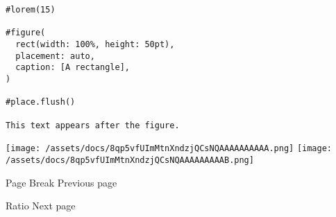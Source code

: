 \begin{verbatim}
#lorem(15)

#figure(
  rect(width: 100%, height: 50pt),
  placement: auto,
  caption: [A rectangle],
)

#place.flush()

This text appears after the figure.
\end{verbatim}

\texttt{[image: /assets/docs/8qp5vfUImMtnXndzjQCsNQAAAAAAAAAA.png]}
\texttt{[image: /assets/docs/8qp5vfUImMtnXndzjQCsNQAAAAAAAAAB.png]}

\href{/docs/reference/layout/pagebreak/}{\pandocbounded{}}

{ Page Break } { Previous page }

\href{/docs/reference/layout/ratio/}{\pandocbounded{}}

{ Ratio } { Next page }
